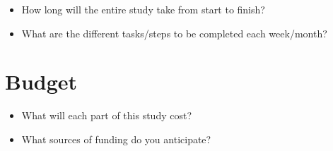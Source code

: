 \documentclass[12pt]{article}
\begin{document}
\begin{itemize}
\item How long will the entire study take from start to finish?
\item What are the different tasks/steps to be completed each week/month?
\end{itemize}

\section{Budget}

\begin{itemize}
\item What will each part of this study cost?
\item What sources of funding do you anticipate?
\end{itemize}
\end{document}

